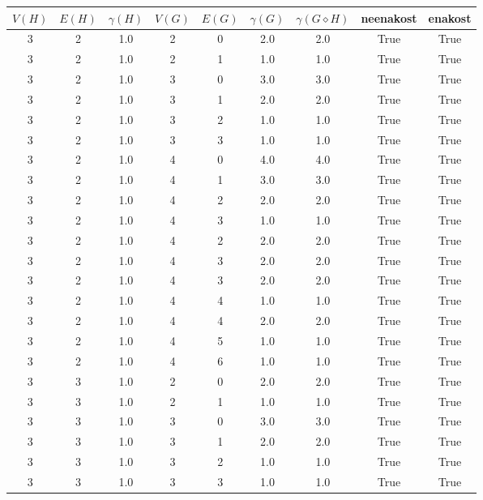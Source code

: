 \documentclass[a4paper,12pt]{article}
\begin{document}
\begin{center}
    \begin{tabular}{ c c c | c c c | c | c | c}
        $V(H)$ & $E(H)$ & $\gamma(H)$ & $V(G)$ & $E(G)$ & $\gamma(G)$ & $\gamma(G \diamond H)$ & neenakost & enakost \\
        \hline
        3 & 2 & 1.0 & 2 & 0 & 2.0 & 2.0 & True & True     \\
        3 & 2 & 1.0 & 2 & 1 & 1.0 & 1.0 & True & True     \\
        3 & 2 & 1.0 & 3 & 0 & 3.0 & 3.0 & True & True     \\
        3 & 2 & 1.0 & 3 & 1 & 2.0 & 2.0 & True & True     \\
        3 & 2 & 1.0 & 3 & 2 & 1.0 & 1.0 & True & True     \\
        3 & 2 & 1.0 & 3 & 3 & 1.0 & 1.0 & True & True     \\
        3 & 2 & 1.0 & 4 & 0 & 4.0 & 4.0 & True & True     \\
        3 & 2 & 1.0 & 4 & 1 & 3.0 & 3.0 & True & True     \\
        3 & 2 & 1.0 & 4 & 2 & 2.0 & 2.0 & True & True     \\
        3 & 2 & 1.0 & 4 & 3 & 1.0 & 1.0 & True & True     \\
        3 & 2 & 1.0 & 4 & 2 & 2.0 & 2.0 & True & True     \\
        3 & 2 & 1.0 & 4 & 3 & 2.0 & 2.0 & True & True     \\
        3 & 2 & 1.0 & 4 & 3 & 2.0 & 2.0 & True & True     \\
        3 & 2 & 1.0 & 4 & 4 & 1.0 & 1.0 & True & True     \\
        3 & 2 & 1.0 & 4 & 4 & 2.0 & 2.0 & True & True     \\
        3 & 2 & 1.0 & 4 & 5 & 1.0 & 1.0 & True & True     \\
        3 & 2 & 1.0 & 4 & 6 & 1.0 & 1.0 & True & True     \\
        3 & 3 & 1.0 & 2 & 0 & 2.0 & 2.0 & True & True     \\
        3 & 3 & 1.0 & 2 & 1 & 1.0 & 1.0 & True & True     \\
        3 & 3 & 1.0 & 3 & 0 & 3.0 & 3.0 & True & True     \\
        3 & 3 & 1.0 & 3 & 1 & 2.0 & 2.0 & True & True     \\
        3 & 3 & 1.0 & 3 & 2 & 1.0 & 1.0 & True & True     \\
        3 & 3 & 1.0 & 3 & 3 & 1.0 & 1.0 & True & True     \\

\end{tabular}
\end{center}
\end{document}
